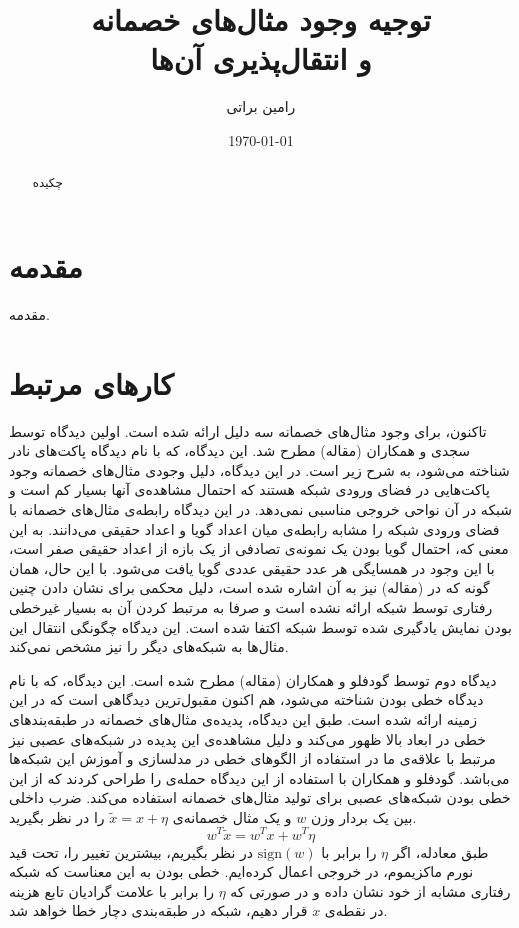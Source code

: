 \documentclass[12pt,onecolumn,a4paper]{article}
\begin{document}
\title{توجیه وجود مثال‌های خصمانه \\ و انتقال‌پذیری آن‌ها} 
\author{رامین براتی}
\date{\today}
\maketitle

\begin{abstract}
چکیده
\end{abstract}

\section{مقدمه} 
مقدمه.

\section{کارهای مرتبط}
تاکنون، برای وجود مثال‌های خصمانه سه دلیل ارائه شده است. اولین دیدگاه توسط سجدی و همکاران
(مقاله)
مطرح شد. این دیدگاه، که با نام دیدگاه پاکت‌های نادر شناخته می‌شود، به شرح زیر است. در این دیدگاه، دلیل وجودی مثال‌های خصمانه وجود پاکت‌هایی در فضای ورودی شبکه هستند که احتمال مشاهده‌ی آنها بسیار کم است و شبکه در آن نواحی خروجی مناسبی نمی‌دهد. در این دیدگاه رابطه‌ی مثال‌های خصمانه با فضای ورودی شبکه را مشابه رابطه‌ی میان اعداد گویا و اعداد حقیقی می‌دانند. به این معنی که، احتمال گویا بودن یک نمونه‌ی تصادفی از یک بازه از اعداد حقیقی صفر است، با این وجود در همسایگی هر عدد حقیقی عددی گویا یافت می‌شود. با این حال،
همان گونه که در
(مقاله)
نیز به آن اشاره شده است، دلیل محکمی برای نشان دادن چنین رفتاری توسط شبکه ارائه نشده است و صرفا به مرتبط کردن آن به بسیار غیرخطی بودن نمایش یادگیری شده توسط شبکه اکتفا شده است. این دیدگاه چگونگی انتقال این مثال‌ها به شبکه‌های دیگر را نیز مشخص نمی‌کند.

دیدگاه دوم توسط گودفلو و همکاران
(مقاله)
مطرح شده است. این دیدگاه، که با نام دیدگاه خطی بودن شناخته می‌شود، هم اکنون مقبول‌ترین دیدگاهی است که در این زمینه ارائه شده است. طبق این دیدگاه، پدیده‌ی مثال‌های خصمانه در طبقه‌بندهای خطی در ابعاد بالا ظهور می‌کند و دلیل مشاهده‌ی این پدیده در شبکه‌های عصبی نیز مرتبط با علاقه‌ی ما در استفاده از الگوهای خطی در مدلسازی و آموزش این شبکه‌ها می‌باشد. گودفلو و همکاران با استفاده از این دیدگاه حمله‌ی
را طراحی کردند که از این خطی بودن شبکه‌های عصبی برای تولید مثال‌های خصمانه استفاده می‌کند. ضرب داخلی بین یک بردار وزن $w$ و یک مثال خصمانه‌ی $\tilde{x}=x+\eta$ را در نظر بگیرید.
\begin{equation*}
w^T\tilde{x}=w^Tx+w^T\eta
\end{equation*}
طبق معادله، اگر $\eta$ را برابر با $\mathrm{sign}(w)$ در نظر بگیریم، بیشترین تغییر را، تحت قید نورم ماکزیموم، در خروجی اعمال کرده‌ایم. خطی بودن به این معناست که شبکه رفتاری مشابه از خود نشان داده و در صورتی که $\eta$ را برابر با علامت گرادیان تابع هزینه در نقطه‌ی $x$ قرار دهیم، شبکه در طبقه‌بندی دچار خطا خواهد شد.
\end{document}
